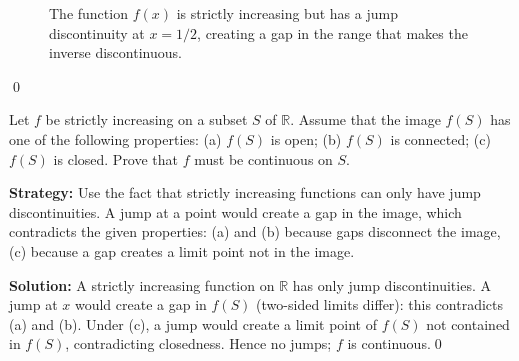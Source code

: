 \begin{figure}[h]
\centering
{}
\caption{The function $f(x)$ is strictly increasing but has a jump discontinuity at $x=1/2$, creating a gap in the range that makes the inverse discontinuous.}
\end{figure}\qed



\begin{problembox}
\begin{problemstatement}
Let $f$ be strictly increasing on a subset $S$ of $\mathbb{R}$. Assume that the image $f(S)$ has one of the following properties: 
(a) $f(S)$ is open; (b) $f(S)$ is connected; (c) $f(S)$ is closed. Prove that $f$ must be continuous on $S$.
\end{problemstatement}
\end{problembox}

\noindent\textbf{Strategy:} Use the fact that strictly increasing functions can only have jump discontinuities. A jump at a point would create a gap in the image, which contradicts the given properties: (a) and (b) because gaps disconnect the image, (c) because a gap creates a limit point not in the image.

\bigskip\noindent\textbf{Solution:}
A strictly increasing function on $\mathbb{R}$ has only jump discontinuities. A jump at $x$ would create a gap in $f(S)$ (two-sided limits differ): this contradicts (a) and (b). Under (c), a jump would create a limit point of $f(S)$ not contained in $f(S)$, contradicting closedness. Hence no jumps; $f$ is continuous.\qed

